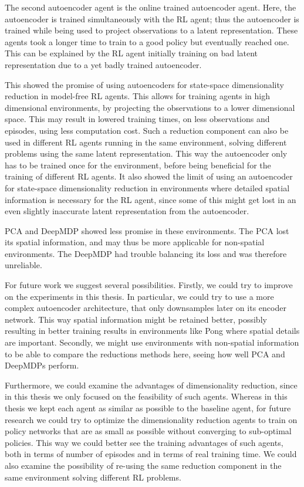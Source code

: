The second autoencoder agent is the online trained autoencoder agent. Here, the autoencoder is trained simultaneously with the RL agent; thus the autoencoder is trained while being used to project observations to a latent representation. These agents took a longer time to train to a good policy but eventually reached one. This can be explained by the RL agent initially training on bad latent representation due to a yet badly trained autoencoder.

This showed the promise of using autoencoders for state-space dimensionality reduction in model-free RL agents. This allows for training agents in high dimensional environments, by projecting the observations to a lower dimensional space. This may result in lowered training times, on less observations and episodes, using less computation cost. Such a reduction component can also be used in different RL agents running in the same environment, solving different problems using the same latent representation. This way the autoencoder only has to be trained once for the environment, before being beneficial for the training of different RL agents. It also showed the limit of using an autoencoder for state-space dimensionality reduction in environments where detailed spatial information is necessary for the RL agent, since some of this might get lost in an even slightly inaccurate latent representation from the autoencoder.

PCA and DeepMDP showed less promise in these environments. The PCA lost its spatial information, and may thus be more applicable for non-spatial environments. The DeepMDP had trouble balancing its loss and was therefore unreliable.

For future work we suggest several possibilities. Firstly, we could try to improve on the experiments in this thesis. In particular, we could try to use a more complex autoencoder architecture, that only downsamples later on its encoder network. This way spatial information might be retained better, possibly resulting in better training results in environments like Pong where spatial details are important. Secondly, we might use environments with non-spatial information to be able to compare the reductions methods here, seeing how well PCA and DeepMDPs perform. 

Furthermore, we could examine the advantages of dimensionality reduction, since in this thesis we only focused on the feasibility of such agents. Whereas in this thesis we kept each agent as similar as possible to the baseline agent, for future research we could try to optimize the dimensionality reduction agents to train on policy networks that are as small as possible without converging to sub-optimal policies. This way we could better see the training advantages of such agents, both in terms of number of episodes and in terms of real training time. We could also examine the possibility of re-using the same reduction component in the same environment solving different RL problems.